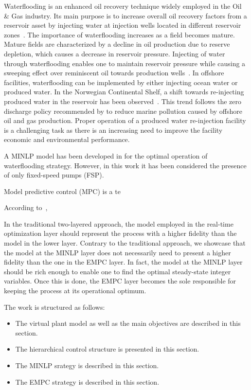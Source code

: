 Waterflooding is an enhanced oil recovery technique widely employed in the Oil \& Gas industry. Its main purpose is to increase overall oil recovery factors from a reservoir asset by injecting water at injection wells located in different reservoir zones~\citep{}. The importance of waterflooding increases as a field becomes mature. Mature fields are characterized by a decline in oil production due to reserve depletion, which causes a decrease in reservoir pressure. Injecting of water through waterflooding enables one to maintain reservoir pressure while causing a sweeping effect over reminiscent oil towards  production wells~\citep{}. In offshore facilities, waterflooding can be implemented by either injecting ocean water or produced water. In the Norwegian Continental Shelf, a shift towards re-injecting produced water in the reservoir has been observed~\citep{}. This trend follows the zero discharge policy recommended by \citep{} to reduce marine pollution caused by offshore oil and gas production. Proper operation of a produced water re-injection facility is a challenging task as there is an increasing need to improve the facility economic and environmental performance. 

\par A MINLP model has been developed in \citep{Zhou2019} for the optimal operation of waterflooding strategy. However, in this work it has been considered the presence of only fixed-speed pumps (FSP).


\par Model predictive control (MPC) is a te


According to~\citep{}, 

\par In the traditional two-layered approach, the model employed in the real-time optimization layer should represent the process with a higher fidelity than the model in the lower layer. Contrary to the traditional approach, we showcase that the model at the MINLP layer does not necessarily need to present a higher fidelity than the one in the EMPC layer. In fact, the model at the MINLP layer should be rich enough to enable one to find the optimal steady-state integer variables. Once this is done, the EMPC layer becomes the sole responsible for keeping the process at its operational optimum.

\par The work is structured as follows:
\begin{itemize}
    \item The virtual plant model as well as the main objectives are described in this section.
    \item The hierarchical control structure is presented in this section.
    \item The MINLP srategy is described in this section.
    \item The EMPC strategy is described in this section.
\end{itemize}
